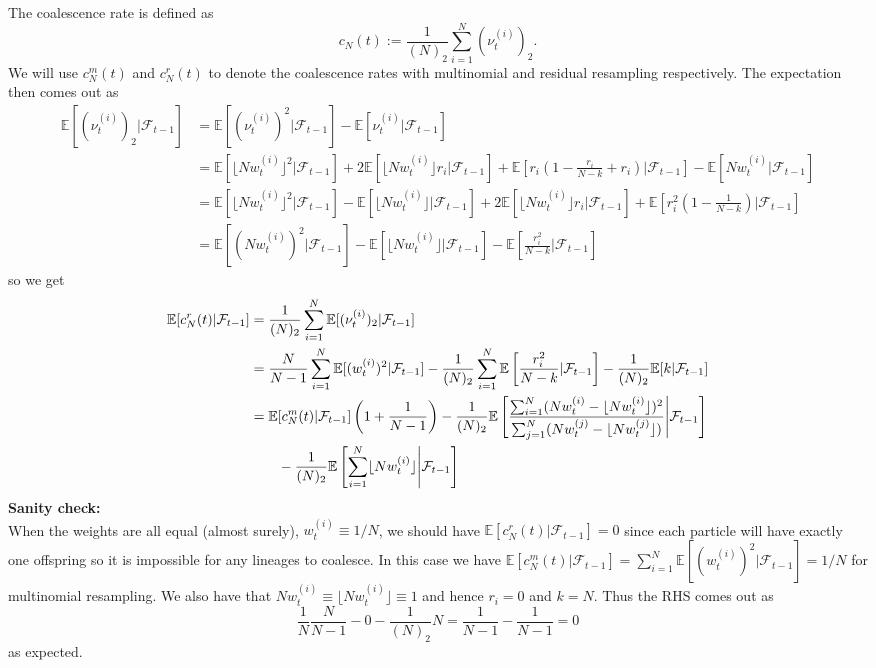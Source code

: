 \documentclass{article}
\newcommand{\E}{\mathbb{E}}
\newcommand{\1}[1]{\mathbbm{1}_{#1}}
\begin{document}
The coalescence rate is defined as
\begin{equation*}
c_N(t) := \frac{1}{(N)_2} \sum_{i=1}^{N} (\nu_t^{(i)})_2.
\end{equation*}
We will use $c_N^m(t)$ and $c_N^r(t)$ to denote the coalescence rates with multinomial and residual resampling respectively.
The expectation then comes out as
\begin{align*}
\E[(\nu_t^{(i)})_2 |\mathcal{F}_{t-1}] &= \E[(\nu_t^{(i)})^2 |\mathcal{F}_{t-1}] - \E[\nu_t^{(i)} |\mathcal{F}_{t-1}] \\
&= \E[\lfloor Nw_t^{(i)} \rfloor^2 |\mathcal{F}_{t-1}] + 2 \E[\lfloor Nw_t^{(i)} \rfloor r_i |\mathcal{F}_{t-1}] + \E\left[ r_i \left(1 - \frac{r_i}{N-k} + r_i \right) |\mathcal{F}_{t-1} \right] - \E[Nw_t^{(i)} |\mathcal{F}_{t-1}] \\
&=\E[ \lfloor Nw_t^{(i)} \rfloor^2 |\mathcal{F}_{t-1}] - \E[ \lfloor Nw_t^{(i)} \rfloor |\mathcal{F}_{t-1}] + 2 \E[ \lfloor Nw_t^{(i)} \rfloor r_i |\mathcal{F}_{t-1}] + \E\left[ r_i^2 \left(1- \frac{1}{N-k} \right) |\mathcal{F}_{t-1}\right] \\
&= \E[ (Nw_t^{(i)})^2 |\mathcal{F}_{t-1}] - \E[ \lfloor Nw_t^{(i)} \rfloor |\mathcal{F}_{t-1}] - \E\left[ \frac{r_i^2}{N-k} |\mathcal{F}_{t-1} \right]
\end{align*}
so we get
\begin{align}
\E[c^r_N(t) |\mathcal{F}_{t-1}] &=  \frac{1}{(N)_2}  \sum_{i=1}^{N} \E[(\nu_t^{(i)})_2 |\mathcal{F}_{t-1} ]\notag\\
&= \frac{N}{N-1} \sum_{i=1}^{N} \E[(w_t^{(i)})^2 |\mathcal{F}_{t-1}] - \frac{1}{(N)_2} \sum_{i=1}^{N} \E\left[ \frac{r_i^2}{N-k} |\mathcal{F}_{t-1} \right] - \frac{1}{(N)_2} \E[k |\mathcal{F}_{t-1}] \notag\\
&= \E[c^{m}_N(t) |\mathcal{F}_{t-1}] \left( 1 + \frac{1}{N-1} \right) - \frac{1}{(N)_2}  \E\left[ \frac{\sum_{i=1}^{N} (Nw_t^{(i)} - \lfloor Nw_t^{(i)}\rfloor)^2}{\sum_{j=1}^{N} (Nw_t^{(j)} - \lfloor Nw_t^{(j)}\rfloor)} \middle|\mathcal{F}_{t-1} \right] \notag\\
&\qquad -\frac{1}{(N)_2} \E \left[ \sum_{i=1}^{N} \lfloor Nw_t^{(i)}\rfloor \middle|\mathcal{F}_{t-1} \right]
\label{eq:cNt_1}
\end{align}
\textbf{Sanity check:}\\
When the weights are all equal (almost surely), $w_t^{(i)} \equiv 1/N$, we should have $\E[c^r_N(t) |\mathcal{F}_{t-1}] = 0$ since each particle will have exactly one offspring so it is impossible for any lineages to coalesce. In this case we have $\E[c^{m}_N(t) |\mathcal{F}_{t-1}] = \sum_{i=1}^{N} \E[(w_t^{(i)})^2 |\mathcal{F}_{t-1}] = 1/N$ for multinomial resampling. We also have that $Nw_t^{(i)} \equiv \lfloor Nw_t^{(i)} \rfloor \equiv 1$ and hence $r_i = 0$ and $k=N$. Thus the RHS comes out as
\begin{equation*}
\frac{1}{N}\frac{N}{N-1} - 0 - \frac{1}{(N)_2} N = \frac{1}{N-1} - \frac{1}{N-1} = 0
\end{equation*}
as expected.\\
\end{document}
